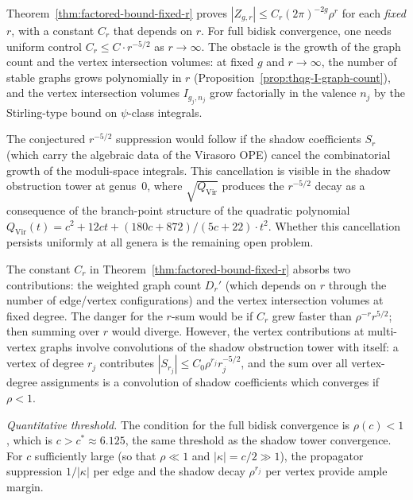 \begin{remark}
\label{rem:bidisk-obstacle}
Theorem~\ref{thm:factored-bound-fixed-r} proves
$|Z_{g,r}| \leq C_r (2\pi)^{-2g} \rho^r$ for each
\emph{fixed} $r$, with a constant $C_r$ that depends on $r$.
For full bidisk convergence, one needs uniform control
$C_r \leq C \cdot r^{-5/2}$ as $r \to \infty$. The obstacle
is the growth of the graph count and the vertex intersection
volumes: at fixed $g$ and $r \to \infty$, the number of stable
graphs grows polynomially in $r$
(Proposition~\ref{prop:thqg-I-graph-count}), and the vertex
intersection volumes $I_{g_j, n_j}$ grow factorially in the
valence $n_j$ by the Stirling-type bound on $\psi$-class
integrals.

The conjectured $r^{-5/2}$ suppression would follow if the
shadow coefficients $S_r$ (which carry the algebraic data of
the Virasoro OPE) cancel the combinatorial growth of the
moduli-space integrals. This cancellation is visible in the
shadow obstruction tower at genus~$0$, where $\sqrt{Q_{\mathrm{Vir}}}$
produces the $r^{-5/2}$ decay as a consequence of the
branch-point structure of the quadratic polynomial
$Q_{\mathrm{Vir}}(t) = c^2 + 12ct + (180c + 872)/(5c+22)
\cdot t^2$. Whether this cancellation persists uniformly at
all genera is the remaining open problem.

The constant $C_r$ in
Theorem~\ref{thm:factored-bound-fixed-r} absorbs two
contributions: the weighted graph count $D_r'$ (which depends
on $r$ through the number of edge/vertex configurations) and
the vertex intersection volumes at fixed degree. The danger
for the $r$-sum would be if $C_r$ grew faster than
$\rho^{-r} r^{5/2}$; then summing over $r$ would diverge.
However, the vertex contributions at multi-vertex graphs
involve convolutions of the shadow obstruction tower with itself: a
vertex of degree $r_j$ contributes
$|S_{r_j}| \leq C_0 \rho^{r_j} r_j^{-5/2}$, and the sum
over all vertex-degree assignments is a convolution of shadow
coefficients which converges if $\rho < 1$.

\emph{Quantitative threshold.} The condition for the full
bidisk convergence is $\rho(c) < 1$, which is
$c > c^* \approx 6.125$, the same threshold as the shadow
tower convergence. For $c$ sufficiently large (so that
$\rho \ll 1$ and $|\kappa| = c/2 \gg 1$), the propagator
suppression $1/|\kappa|$ per edge and the shadow decay
$\rho^{r_j}$ per vertex provide ample margin.


\end{remark}
